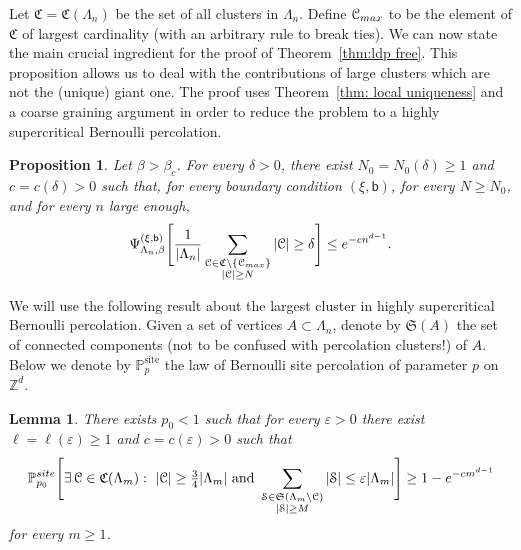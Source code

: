 \documentclass[11pt,a4paper]{article}
\newtheorem{lemma}[theorem]{Lemma}
\newtheorem{proposition}[theorem]{Proposition}
\theoremstyle{definition}
\numberwithin{equation}{section}
\begin{document}
Let $\mathfrak{C}=\mathfrak{C}(\Lambda_n)$ be the set of all clusters in $\Lambda_n$. Define $\mathcal{C}_{\rm max}$ to be the element of $\mathfrak{C}$ of largest cardinality (with an arbitrary rule to break ties). 
We can now state the main crucial ingredient for the proof of Theorem~\ref{thm:ldp free}. This proposition allows us to deal with the contributions of large clusters which are not the (unique) giant one.
The proof uses Theorem~\ref{thm: local uniqueness} and a coarse graining argument in order to reduce the problem to a highly supercritical Bernoulli percolation.


\begin{proposition}\label{prop: cluster renormalisation}
Let $\beta>\beta_c$. For every $\delta>0$, there exist $N_0=N_0(\delta)\geq 1$ and $c=c(\delta)>0$ such that, for every boundary condition $(\xi,\mathsf{b})$, for every $N\geq N_0$, and for every $n$ large enough,
\begin{equation}\label{eq:large_clusters_dev}
\Psi^{(\xi,\mathsf{b})}_{\Lambda_n,\beta}\Bigg[ \frac{1}{|\Lambda_n|} \sum_{
\substack{\mathcal{C}\in \mathfrak{C}\setminus\{\mathcal{C}_{\rm max}\}\\ |\mathcal{C}|\geq N}} |\mathcal{C}| \geq \delta \Bigg]\leq e^{-cn^{d-1}}.     
\end{equation}
\end{proposition}

We will use the following result about the largest cluster in highly supercritical Bernoulli percolation.
Given a set of vertices $A\subset \Lambda_n$, denote by $\mathfrak{S}(A)$ the set of connected components (not to be confused with percolation clusters!) of $A$. 
Below we denote by $\mathbb{P}^{\text{site}}_p$ the law of Bernoulli site percolation of parameter $p$ on $\mathbb{Z}^d$.

\begin{lemma}\label{lem:Bernoulli_surf_dev}
There exists $p_0<1$ such that for every $\varepsilon>0$ there exist $\ell=\ell(\varepsilon)\geq 1$ and $c=c(\varepsilon)>0$ such that    
\begin{equation}\label{eq:Bernoulli_surf_dev}
\mathbb{P}^{\textup{site}}_{p_0}\Bigg[\exists \, {\mathcal{C}}\in \mathfrak{C}(\Lambda_m):~ |{\mathcal{C}}|\geq \tfrac{3}{4}|\Lambda_m| \text{ and } \sum_{\substack{\mathcal{S}\in \mathfrak{S}(\Lambda_m\setminus \mathcal{C}) \\ |\mathcal{S}|\geq M}}|\mathcal{S}|\leq \varepsilon |\Lambda_m|\Bigg]\geq 1-e^{-cm^{d-1}}    
\end{equation}
for every $m\geq 1$.
\end{lemma}
\end{document}
